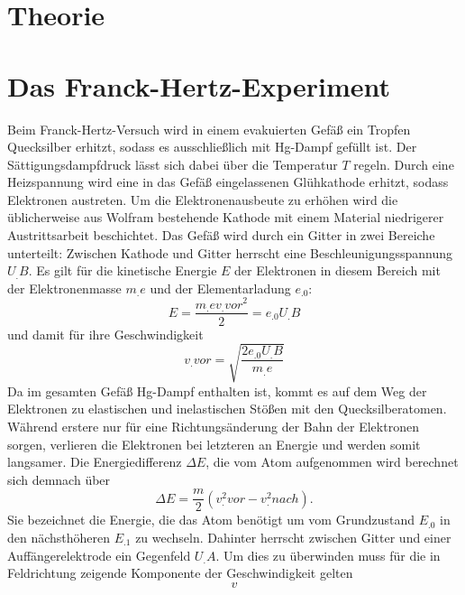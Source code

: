 
\section{Theorie}
\label{sec:Theorie}

\section{Das Franck-Hertz-Experiment}

Beim Franck-Hertz-Versuch wird in einem evakuierten Gefäß ein Tropfen Quecksilber erhitzt, sodass es ausschließlich mit Hg-Dampf gefüllt ist. Der Sättigungsdampfdruck lässt sich dabei über die Temperatur $T$ regeln.
Durch eine Heizspannung wird eine in das Gefäß eingelassenen Glühkathode erhitzt, sodass Elektronen austreten. Um die Elektronenausbeute zu erhöhen wird die üblicherweise aus Wolfram bestehende Kathode mit einem Material niedrigerer Austrittsarbeit beschichtet.
Das Gefäß wird durch ein Gitter in zwei Bereiche unterteilt:
Zwischen Kathode und Gitter herrscht eine Beschleunigungsspannung $U_.B$.
Es gilt für die kinetische Energie $E$ der Elektronen in diesem Bereich mit der Elektronenmasse $m_.e$ und der Elementarladung $e_.0$:
\begin{equation*}
E=\frac{m_.ev_.{vor^2}}{2}=e_.0U_.B
\end{equation*}
und damit für ihre Geschwindigkeit
\begin{equation}
v_.{vor}=\sqrt{\frac{2e_.0U_.B}{m_.e}\label{eq:v}}
\end{equation}
Da im gesamten Gefäß Hg-Dampf enthalten ist, kommt es auf dem Weg der Elektronen zu elastischen und inelastischen Stößen mit den Quecksilberatomen. Während erstere nur für eine Richtungsänderung der Bahn der Elektronen sorgen, verlieren die Elektronen bei letzteren an Energie und werden somit langsamer.
Die Energiedifferenz $\Delta E$, die vom Atom aufgenommen wird berechnet sich demnach über
\[
\Delta E = \frac{m}{2}\left(v^2_.{vor}-v^2_.{nach}\right)\text{.}\label{eq:DeltaE}
\]
Sie bezeichnet die Energie, die das Atom benötigt um vom Grundzustand $E_.0$ in den nächsthöheren $E_.1$ zu wechseln.
Dahinter herrscht zwischen Gitter und einer Auffängerelektrode ein Gegenfeld $U_.A$.
Um dies zu überwinden muss für die in Feldrichtung zeigende Komponente der Geschwindigkeit gelten
\[
v
\]